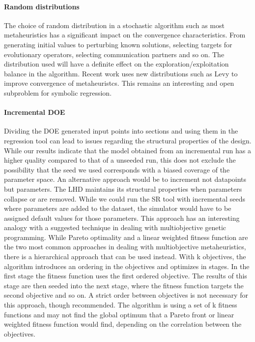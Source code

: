 \paragraph{Random distributions}
The choice of random distribution in a stochastic algorithm such as most metaheuristics has a significant impact on the convergence characteristics. From generating initial values to perturbing known solutions, selecting targets for evolutionary operators, selecting communication partners and so on. The distribution used will have a definite effect on the exploration/exploitation balance in the algorithm. Recent work uses new distributions such as Levy \citep{ABCLevy} to improve convergence of metaheuristcs. This remains an interesting and open subproblem for symbolic regression. 

\paragraph{Incremental DOE}
Dividing the DOE generated input points into sections and using them in the regression tool can lead to issues regarding the structural properties of the design. While our results indicate that the model obtained from an incremental run has a higher quality compared to that  of a unseeded run, this does not exclude the possibility that the seed we used corresponds with a biased coverage of the parameter space. An alternative approach would be to increment not datapoints but parameters. The LHD maintains its structural properties when parameters collapse or are removed. While we could run the SR tool with incremental seeds where parameters are added to the dataset, the simulator would have to be assigned default values for those parameters. This approach has an interesting analogy with a suggested technique in dealing with multiobjective genetic programming. While Pareto optimality and a linear weighted fitness function are the two most common approaches in dealing with multiobjective metaheuristics, there is a hierarchical approach that can be used instead. With k objectives, the algorithm introduces an ordering in the objectives and optimizes in stages. In the first stage the fitness function uses the first ordered objective. The results of this stage are then seeded into the next stage, where the fitness function targets the second objective and so on. A strict order between objectives is not necessary for this approach, though recommended. The algorithm is using a set of k fitness functions and may not find the global optimum that a Pareto front or linear weighted fitness function would find, depending on the correlation between the objectives.
